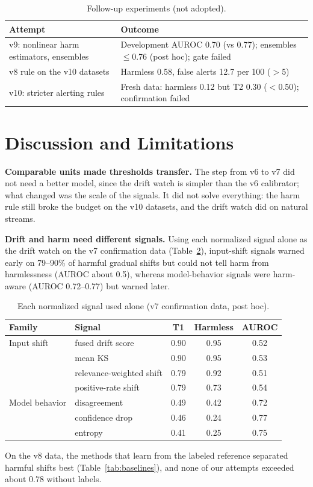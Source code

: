 \documentclass[conference]{IEEEtran}
\begin{document}
\begin{table}[t]
\caption{Follow-up experiments (not adopted).}
\label{tab:followups}
\centering
\footnotesize
\begin{tabular}{@{}p{3.1cm}p{4.6cm}@{}}
\toprule
Attempt & Outcome \\
\midrule
v9: nonlinear harm estimators, ensembles & Development AUROC 0.70 (vs 0.77); ensembles $\leq$0.76 (post hoc); gate failed \\
v8 rule on the v10 datasets & Harmless 0.58, false alerts 12.7 per 100 ($>$5) \\
v10: stricter alerting rules & Fresh data: harmless 0.12 but T2 0.30 ($<$0.50); confirmation failed \\
\bottomrule
\end{tabular}
\end{table}

\section{Discussion and Limitations}
\textbf{Comparable units made thresholds transfer.} The step from v6 to v7 did not need a better model, since the drift watch is simpler than the v6 calibrator; what changed was the scale of the signals. It did not solve everything: the harm rule still broke the budget on the v10 datasets, and the drift watch did on natural streams.

\textbf{Drift and harm need different signals.} Using each normalized signal alone as the drift watch on the v7 confirmation data (Table~\ref{tab:signals}), input-shift signals warned early on 79--90\% of harmful gradual shifts but could not tell harm from harmlessness (AUROC about 0.5), whereas model-behavior signals were harm-aware (AUROC 0.72--0.77) but warned later.

\begin{table}[t]
\caption{Each normalized signal used alone (v7 confirmation data, post hoc).}
\label{tab:signals}
\centering
\footnotesize
\setlength{\tabcolsep}{4pt}
\begin{tabular}{@{}llccc@{}}
\toprule
Family & Signal & T1 & Harmless & AUROC \\
\midrule
Input shift & fused drift score & 0.90 & 0.95 & 0.52 \\
 & mean KS & 0.90 & 0.95 & 0.53 \\
 & relevance-weighted shift & 0.79 & 0.92 & 0.51 \\
 & positive-rate shift & 0.79 & 0.73 & 0.54 \\
Model behavior & disagreement & 0.49 & 0.42 & 0.72 \\
 & confidence drop & 0.46 & 0.24 & 0.77 \\
 & entropy & 0.41 & 0.25 & 0.75 \\
\bottomrule
\end{tabular}
\end{table} On the v8 data, the methods that learn from the labeled reference separated harmful shifts best (Table~\ref{tab:baselines}), and none of our attempts exceeded about 0.78 without labels.
\end{document}
